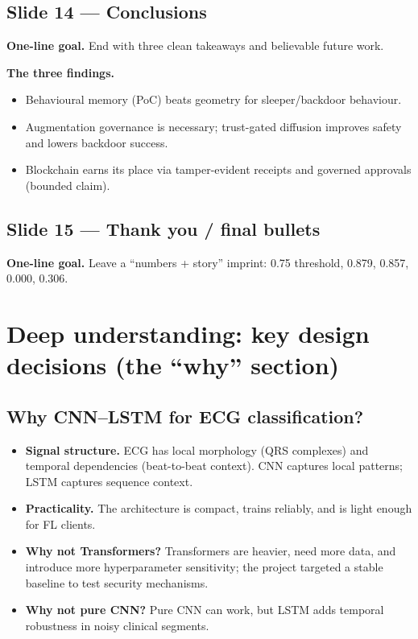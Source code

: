 \documentclass[11pt,a4paper]{article}
\begin{document}
\subsection{Slide 14 --- Conclusions}
\textbf{One-line goal.} End with three clean takeaways and believable future work.

\textbf{The three findings.}
\begin{itemize}
\item Behavioural memory (PoC) beats geometry for sleeper/backdoor behaviour.
\item Augmentation governance is necessary; trust-gated diffusion improves safety and lowers backdoor success.
\item Blockchain earns its place via tamper-evident receipts and governed approvals (bounded claim).
\end{itemize}

\subsection{Slide 15 --- Thank you / final bullets}
\textbf{One-line goal.} Leave a ``numbers + story'' imprint: 0.75 threshold, 0.879, 0.857, 0.000, 0.306.

\newpage
\section{Deep understanding: key design decisions (the ``why'' section)}

\subsection{Why CNN--LSTM for ECG classification?}
\begin{itemize}
\item \textbf{Signal structure.} ECG has local morphology (QRS complexes) and temporal dependencies (beat-to-beat context). CNN captures local patterns; LSTM captures sequence context.
\item \textbf{Practicality.} The architecture is compact, trains reliably, and is light enough for FL clients.
\item \textbf{Why not Transformers?} Transformers are heavier, need more data, and introduce more hyperparameter sensitivity; the project targeted a stable baseline to test security mechanisms.
\item \textbf{Why not pure CNN?} Pure CNN can work, but LSTM adds temporal robustness in noisy clinical segments.
\end{itemize}
\end{document}
